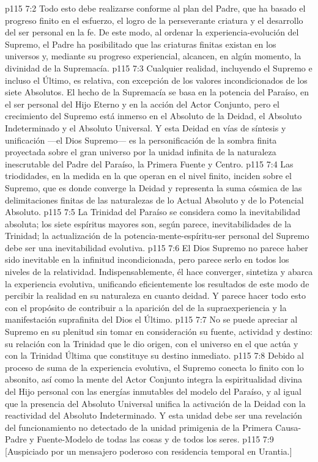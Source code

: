 \vs p115 7:2 Todo esto debe realizarse conforme al plan del Padre, que ha basado el progreso finito en el esfuerzo, el logro de la perseverante criatura y el desarrollo del ser personal en la fe. De este modo, al ordenar la experiencia\hyp{}evolución del Supremo, el Padre ha posibilitado que las criaturas finitas existan en los universos y, mediante su progreso experiencial, alcancen, en algún momento, la divinidad de la Supremacía.
\vs p115 7:3 \pc Cualquier realidad, incluyendo el Supremo e incluso el Último, es relativa, con excepción de los valores incondicionados de los siete Absolutos. El hecho de la Supremacía se basa en la potencia del Paraíso, en el ser personal del Hijo Eterno y en la acción del Actor Conjunto, pero el crecimiento del Supremo está inmerso en el Absoluto de la Deidad, el Absoluto Indeterminado y el Absoluto Universal. Y esta Deidad en vías de síntesis y unificación ---el Dios Supremo--- es la personificación de la sombra finita proyectada sobre el gran universo por la unidad infinita de la naturaleza inescrutable del Padre del Paraíso, la Primera Fuente y Centro.
\vs p115 7:4 Las triodidades, en la medida en la que operan en el nivel finito, inciden sobre el Supremo, que es donde converge la Deidad y representa la suma cósmica de las delimitaciones finitas de las naturalezas de lo Actual Absoluto y de lo Potencial Absoluto.
\vs p115 7:5 \pc La Trinidad del Paraíso se considera como la inevitabilidad absoluta; los siete espíritus mayores son, según parece, inevitabilidades de la Trinidad; la actualización de la potencia\hyp{}mente\hyp{}espíritu\hyp{}ser personal del Supremo debe ser una inevitabilidad evolutiva.
\vs p115 7:6 El Dios Supremo no parece haber sido inevitable en la infinitud incondicionada, pero parece serlo en todos los niveles de la relatividad. Indispensablemente, él hace converger, sintetiza y abarca la experiencia evolutiva, unificando eficientemente los resultados de este modo de percibir la realidad en su naturaleza en cuanto deidad. Y parece hacer todo esto con el propósito de contribuir a la aparición del  de la supraexperiencia y la manifestación suprafinita del Dios el Último.
\vs p115 7:7 No se puede apreciar al Supremo en su plenitud sin tomar en consideración su fuente, actividad y destino: su relación con la Trinidad que le dio origen, con el universo en el que actúa y con la Trinidad Última que constituye su destino inmediato.
\vs p115 7:8 Debido al proceso de suma de la experiencia evolutiva, el Supremo conecta lo finito con lo absonito, así como la mente del Actor Conjunto integra la espiritualidad divina del Hijo personal con las energías inmutables del modelo del Paraíso, y al igual que la presencia del Absoluto Universal unifica la activación de la Deidad con la reactividad del Absoluto Indeterminado. Y esta unidad debe ser una revelación del funcionamiento no detectado de la unidad primigenia de la Primera Causa\hyp{}Padre y Fuente\hyp{}Modelo de todas las cosas y de todos los seres.
\vsetoff
\vs p115 7:9 [Auspiciado por un mensajero poderoso con residencia temporal en Urantia.]
